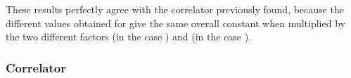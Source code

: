\documentclass[a4paper,12pt]{report}
\begin{document}
These results perfectly agree with the correlator \coordHE{} previously
found, because the different values obtained for \coordHE{} give the same overall constant when multiplied by the two
different factors \coordHE{} (in the case \coordHE{}) and \coordHE{}
(in the case \coordHE{}).


\subsubsection{Correlator \coordHE{}}
\end{document}

